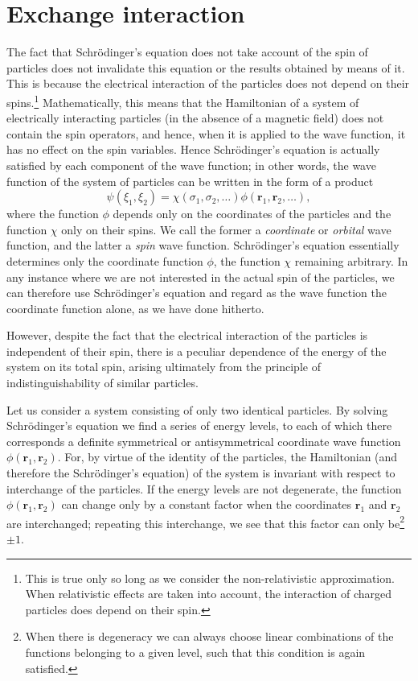 \section{Exchange interaction}\label{Exchange interaction}
The fact that Schr\"odinger’s equation does not take account of the spin of particles does not invalidate this equation or the results obtained by means of it. This is because the electrical interaction of the particles does not depend on their spins.\footnote{This is true only so long as we consider the non-relativistic approximation. When relativistic effects are taken into account, the interaction of charged particles does depend on their spin.
} Mathematically, this means that the Hamiltonian of a system of electrically interacting particles (in the absence of a magnetic field) does not contain the spin operators, and hence, when it is applied to the wave function, it has no effect on the spin variables. Hence Schr\"odinger’s equation is actually satisfied by each component of the wave function; in other words, the wave function of the system of particles can be written in the form of a product
\[ \psi(\xi_1,\xi_2)=\chi(\sigma_1,\sigma_2,\dots)\phi(\bm{r}_1,\bm{r}_2,\dots), \]
where the function $\phi$ depends only on the coordinates of the particles and the function $\chi$ only on their spins. We call the former a \textit{coordinate} or \textit{orbital} wave function, and the latter a \textit{spin} wave function. Schr\"odinger’s equation essentially determines only the coordinate function $\phi$, the function $\chi$ remaining arbitrary. In any instance where we are not interested in the actual spin of the particles, we can therefore use Schr\"odinger’s equation and regard as the wave function the coordinate function alone, as we have done hitherto.

However, despite the fact that the electrical interaction of the particles is independent of their spin, there is a peculiar dependence of the energy of the system on its total spin, arising ultimately from the principle of indistinguishability of similar particles.

Let us consider a system consisting of only two identical particles. By solving Schr\"odinger’s equation we find a series of energy levels, to each of which there corresponds a definite symmetrical or antisymmetrical coordinate wave function $ \phi(\bm{r}_1, \bm{r}_2) $. For, by virtue of the identity of the particles, the Hamiltonian (and therefore the Schr\"odinger’s equation) of the system is invariant with respect to interchange of the particles. If the energy levels are not degenerate, the function $ \phi(\bm{r}_1, \bm{r}_2) $ can change only by a constant factor when the coordinates $ \bm{r}_1 $ and $ \bm{r}_2 $ are interchanged; repeating this interchange, we see that this factor can only be\footnote{When there is degeneracy we can always choose linear combinations of the functions belonging to a given level, such that this condition is again satisfied.
} $ \pm1 $.


